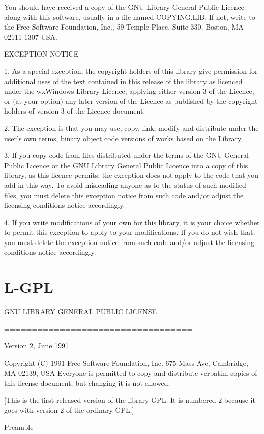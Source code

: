 \documentclass[twoside]{tceusermanual}
\begin{document}
You should have received a copy of the GNU Library General Public Licence
along with this software, usually in a file named COPYING.LIB. If not,
write to the Free Software Foundation, Inc., 59 Temple Place, Suite 330,
Boston, MA 02111-1307 USA.

EXCEPTION NOTICE

1. As a special exception, the copyright holders of this library give
permission for additional uses of the text contained in this release of
the library as licenced under the wxWindows Library Licence, applying
either version 3 of the Licence, or (at your option) any later version of
the Licence as published by the copyright holders of version 3 of the
Licence document.

2. The exception is that you may use, copy, link, modify and distribute
under the user's own terms, binary object code versions of works based
on the Library.

3. If you copy code from files distributed under the terms of the GNU
General Public Licence or the GNU Library General Public Licence into a
copy of this library, as this licence permits, the exception does not
apply to the code that you add in this way. To avoid misleading anyone as
to the status of such modified files, you must delete this exception
notice from such code and/or adjust the licensing conditions notice
accordingly.

4. If you write modifications of your own for this library, it is your
choice whether to permit this exception to apply to your modifications.
If you do not wish that, you must delete the exception notice from such
code and/or adjust the licensing conditions notice accordingly.

\section{L-GPL}

\begin{center}
	  GNU LIBRARY GENERAL PUBLIC LICENSE

	  ==================================

                Version 2, June 1991

 Copyright (C) 1991 Free Software Foundation, Inc.
                    675 Mass Ave, Cambridge, MA 02139, USA
 Everyone is permitted to copy and distribute verbatim copies
 of this license document, but changing it is not allowed.

[This is the first released version of the library GPL.  It is
 numbered 2 because it goes with version 2 of the ordinary GPL.]

Preamble
\end{center}
\end{document}
